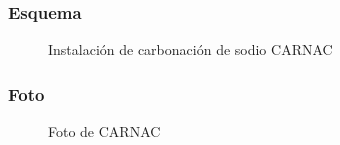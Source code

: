 \documentclass{article}
\begin{document}
\subsubsection*{Esquema}
\begin{figure}[H]
\begin{center}
\end{center}
\caption{Instalación de carbonación de sodio CARNAC}
\end{figure}
\subsubsection*{Foto}
\begin{figure}[H]
\begin{center}
\end{center}
\caption{Foto de CARNAC}
\end{figure}
\end{document}
